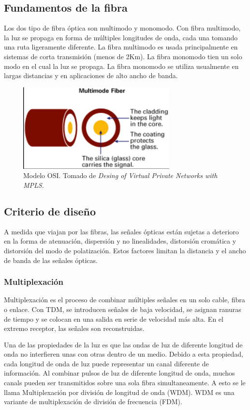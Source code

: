 \documentclass[10pt,journal,compsoc]{IEEEtran}
\begin{document}
\subsection{Fundamentos de la fibra}
Los dos tipo de fibra óptica son multimodo y monomodo. Con fibra multimodo, la luz se propaga en forma de múltiples longitudes de onda, cada una tomando una ruta ligeramente diferente. La fibra multimodo es usada principalmente en sistemas de corta transmisión (menos de 2Km). La fibra monomodo tien un solo modo en el cual la luz se propaga. La fibra monomodo se utiliza usualmente en largas distancias y en aplicaciones de alto ancho de banda.


\begin{figure}[h]
    \center
    \includegraphics[width=8cm]{fibra-multimodo}
    \caption{Modelo OSI. Tomado de  \emph{Desing of Virtual Private Networks with MPLS}\cite{rexford}.}
    \label{fig:fibra-multimodo}
\end{figure}

\subsection{Criterio de diseño}
A medida que viajan por las fibras, las señales ópticas están sujetas a deterioro en la forma de atenuación, dispersión y no linealidades, distorsión cromática y distorsión del modo de polatización. Estos factores limitan la distancia y el ancho de banda de las señales ópticas. 

\subsubsection{Multiplexación}
Multiplexación es el proceso de combinar múltiples señales en un solo cable, fibra o enlace. Con TDM, se introducen señales de baja velocidad, se asignan ranuras de tiempo y se colocan en una salida en serie de velocidad más alta. En el extremo receptor, las señales son reconstruidas.


Una de las propiedades de la luz es que las ondas de luz de diferente longitud de onda no interfieren unas con otras dentro de un medio. Debido a esta propiedad, cada longitud de onda de luz puede representar un canal diferente de información. Al combinar pulsos de luz de diferente longitud de onda, muchos canals pueden ser transmitidos sobre una sola fibra simultaneamente. A esto se le llama Multiplexación por división de longitud de onda (WDM). WDM es una variante de multiplexación de división de frecuencia (FDM).
\end{document}
